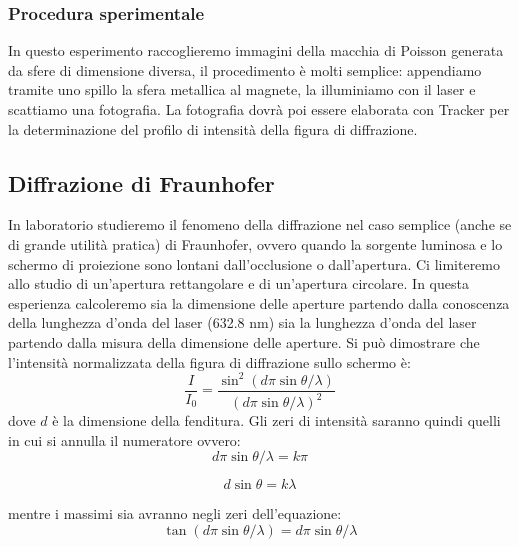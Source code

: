 \documentclass[a4paper,10pt,oneside]{article}
\begin{document}
\subsubsection*{Procedura sperimentale}

 In questo esperimento raccoglieremo immagini della macchia di Poisson generata da sfere di dimensione diversa, il procedimento è  molti semplice: appendiamo tramite uno spillo la sfera metallica al magnete, la illuminiamo con il laser e scattiamo una fotografia. La fotografia dovrà poi essere elaborata con Tracker per la determinazione del profilo di intensità della figura di diffrazione.


\subsection*{Diffrazione di Fraunhofer}

In laboratorio studieremo il fenomeno della diffrazione nel caso semplice (anche se di grande utilità pratica) di Fraunhofer, ovvero quando la sorgente luminosa e lo schermo di proiezione sono lontani dall'occlusione o dall'apertura. Ci limiteremo allo studio di un'apertura rettangolare e di un'apertura circolare. In questa esperienza calcoleremo sia la dimensione delle aperture partendo dalla conoscenza della lunghezza d'onda del laser (632.8 nm) sia la lunghezza d'onda del laser partendo dalla misura della dimensione delle aperture.  Si può dimostrare che l'intensità normalizzata della figura di diffrazione sullo schermo è:
\begin{equation}
 \frac{I}{I_0}=\frac{\sin^2(d\pi\sin\theta/\lambda) }{(d\pi\sin\theta/\lambda)^2}
\end{equation}
dove $d$ è la dimensione della fenditura. Gli zeri di intensità saranno quindi quelli in cui si annulla il numeratore ovvero:
\begin{equation}
 d\pi\sin\theta/\lambda=k\pi
\end{equation}

\begin{equation}
 d\sin\theta=k\lambda
\end{equation}

mentre i massimi sia avranno negli zeri dell'equazione:
\begin{equation}
 \tan(d\pi\sin\theta/\lambda)=d\pi\sin\theta/\lambda
\end{equation}
\end{document}
